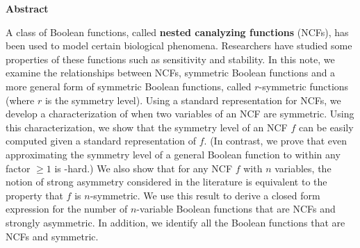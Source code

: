 \vspace*{-0.05in}
\begin{center}
\textbf{Abstract}  %
\end{center}

\smallskip

A class of Boolean functions, 
called \textbf{nested canalyzing functions} (NCFs),
has been used to model certain biological phenomena.
Researchers have studied some properties of these functions
such as sensitivity and stability.
In this note, we examine the relationships between NCFs, symmetric 
Boolean functions and a more general form of symmetric Boolean functions,
called $r$-symmetric functions (where $r$ is the symmetry level).
Using a standard representation for NCFs, we develop a 
characterization of when two variables of an NCF are symmetric.
Using this characterization, we show 
that the symmetry level of an NCF $f$
can be easily computed given a standard representation of $f$.
(In contrast, we prove that even approximating the symmetry level of
a general Boolean function to within any factor $\geq 1$ is \cnp-hard.) 
We also show that for any NCF $f$ with $n$ variables, the notion of
strong asymmetry considered in the literature is equivalent to
the property that $f$ is $n$-symmetric. 
We use this result to derive a closed form expression for the
number of $n$-variable Boolean functions 
that are NCFs and strongly asymmetric.
In addition, we identify all the Boolean functions that are NCFs 
and symmetric. 
